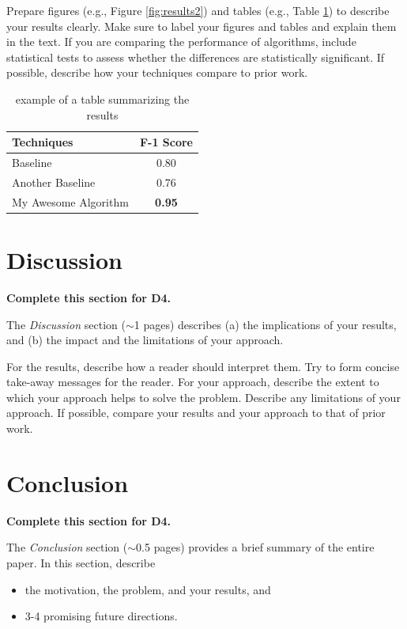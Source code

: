 \documentclass[letterpaper]{article} %
\begin{document}
Prepare figures (e.g., Figure \ref{fig:results2}) and tables (e.g., Table \ref{tab:results1}) to describe your results clearly.  Make sure to label your figures and tables and explain them in the text.  If you are comparing the performance of algorithms, include statistical tests to assess whether the differences are statistically significant.  If possible, describe how your techniques compare to prior work.  

\begin{table}[h!]
    \centering
    \normalsize{
    \begin{tabular}{ l c }
    \hline
         Techniques & F-1 Score\\
         \hline
          Baseline & 0.80 \\
          Another Baseline & 0.76\\
          My Awesome Algorithm & {\bf 0.95}\\
         \hline
    \end{tabular}}
    \caption{example of a table summarizing the results}
    \label{tab:results1}
\end{table} 




\section{Discussion}

{\bf Complete this section for D4.}

The {\it Discussion} section ($\sim$1 pages) describes (a) the implications of your results, and (b) the impact and the limitations of your approach.  

For the results, describe how a reader should interpret them.  Try to form concise take-away messages for the reader.  For your approach, describe the extent to which your approach helps to solve the problem.  Describe any limitations of your approach.  If possible, compare your results and your approach to that of prior work. 


\section{Conclusion}

{\bf Complete this section for D4.}

The {\it Conclusion} section ($\sim$0.5 pages) provides a brief summary of the entire paper.  In this section, describe 
\begin{itemize}
    \item the motivation, the problem, and your results, and
    \item 3-4 promising future directions.
\end{itemize}

\newpage



\end{document}
